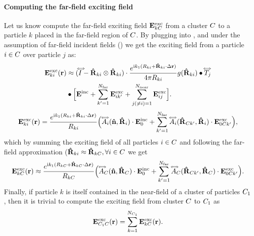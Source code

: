 \paragraph{Computing the far-field exciting field}
Let us know compute the far-field exciting field $\mathbf{E}^\text{exc}_{k C}$ from a cluster $C$ to a particle $k$ placed in the far-field region of $C$. By plugging  into , and under the assumption of far-field incident fields () we get the exciting field from a particle $i\in C$ over particle $j$ as:
%
\begin{align}
\ExcEField_{ki}(\px) & \approx (\sIdDyad - \dPx_{ki}\otimes\dPx_{ki}) \cdot\frac{e^{\img k_1 (\tPx_{ki}+\dPx_{ki}\cdot{\Delta}\px)}}{4\pi\tPx_{ki}}  \sGreenProp(\dPx_{ki}) \bigcdot{\px'} \dyad{T}_j \nonumber \\ &\bigcdot{\px''}\Big[\IncEField + \sum_{k'=1}^\Nfar \ExcEField_{ik'} + \sum_{j(\neq i)=1}^\Nnear \ExcEField_{ij}\Big].
\label{eq:excfield_fartwo}
\end{align}
%
%
\begin{align}
\mathbf{E}^\text{exc}_{ki}(\mathbf{r}) = \frac{e^{\text{i} k_1 (R_{ki}+\mathbf{\hat{R}}_{ki}\cdot{\Delta}\mathbf{r})}}{R_{ki}} \Big(\accentset{\Longleftrightarrow}{A}_i(\mathbf{\hat{n}},\mathbf{\hat{R}}_i) \cdot\mathbf{E}^\text{inc}_0
+ \sum_{k'=1}^{N_{\text{far}}} \accentset{\Longleftrightarrow}{A}_i(\mathbf{\hat{R}}_{C k'},\mathbf{\hat{R}}_i)\cdot \mathbf{E}^\text{exc}_{0C k'}  \Big),
\end{align}
%
which by summing the exciting field of all particles $i\in C$ and following the far-field approximation ($\mathbf{\hat{R}}_{ki}\approx\mathbf{\hat{R}}_{kC}, \forall i\in C$ we get
\begin{equation}
\label{eq:excfield_cluster_far}
\ExcEField_{k\Cls}(\px) \approx \frac{e^{\img k_1 (\tPx_{k\Cls}+\dPx_{k\Cls}\cdot{\Delta}\px)}}{\tPx_{k\Cls}}\Big( \ScaDyad_\Cls(\dw,\dPx_\Cls)\cdot\IncEField_0 + \sum_{k'=1}^\Nfar \ScaDyad_\Cls(\dPx_{\Cls k'},\dPx_\Cls)\cdot \ExcEField_{0\Cls k'} \Big).
\end{equation}
%
Finally, if particle $k$ is itself contained in the near-field of a cluster of particles $C_1$, then it is trivial to compute the exciting field from cluster $C$ to $C_1$ as
\begin{equation}
\ExcEField_{\Cls_1\Cls}(\px) = \sum_{k=1}^{N_{\Cls_1}} \ExcEField_{k\Cls}(\px).
\label{eq:excfield_cluster_far2}
\end{equation}
%

